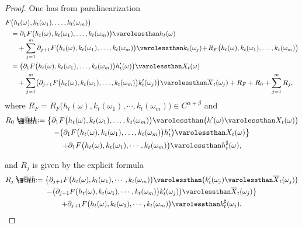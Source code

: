 \documentclass[JEP,XML,SOM,Unicode,published]{cedram}
\makeatletter
\theoremstyle{definition}
\newcommand*{\defeq}{\mathrel{\rlap{%
\raisebox{0.3ex}{$\m@th\cdot$}}%
\raisebox{-0.3ex}{$\m@th\cdot$}}%
=}
\makeatother
\begin{document}
\begin{proof}
One has from paralinearization
\begin{equation*} \begin{split}
F&\bigl(h_t(\omega), k_t(\omega_1),\dots, k_t(\omega_m)\bigr)\\
&= \partial_1F\bigl(h_t(\omega), k_t(\omega_1),\dots, k_t(\omega_m)\bigr) \varolessthan h_t(\omega) \\[-3pt]
&\quad+ \sum_{j=1}^m\partial_{j+1}F\bigl(h_t(\omega), k_t(\omega_1),\dots, k_t(\omega_m)\bigr) \varolessthan k_t(\omega_j)
\!+\! R_F\bigl(h_t(\omega), k_t(\omega_1),\dots, k_t(\omega_m)\bigr)\\
&=\bigl( \partial_1F\bigl(h_t(\omega), k_t(\omega_1),\dots, k_t(\omega_m)\bigr)h_t'(\omega) \bigr) \varolessthan X_t(\omega) \\
&\quad+ \sum_{j=1}^m\bigl(\partial_{j+1} F\bigl(h_t(\omega), k_t(\omega_1),\dots, k_t(\omega_m)\bigr)k_t'(\omega_j)\bigr) \varolessthan \overline X_t(\omega_j)+ R_F + R_0 + \sum_{j=1}^m R_j,
\end{split} \end{equation*}
where $R_F = R_F\bigl(h_t(\omega), k_t(\omega_1),\cdots, k_t(\omega_m)\bigr)\in C^{\alpha+\beta}$ and
\begin{multline*}
R_0\defeq \bigl\{\partial_1F\bigl(h_t(\omega), k_t(\omega_1), \dots, k_t(\omega_m)\bigr) \varolessthan\bigl(h'(\omega) \varolessthan X_t(\omega)\bigr) \\
- \bigl(\partial_1F\bigl(h_t(\omega), k_t(\omega_1), \dots, k_t(\omega_m)\bigr)h_t'\bigr) \varolessthan X_t(\omega) \bigr\} \\
+ \partial_1F\bigl(h_t(\omega), k_t(\omega_1),\cdots, k_t(\omega_m)\bigr) \varolessthan h_t^{\sharp}(\omega),
\end{multline*}
\par\noindent
\begin{minipage}{\textwidth}
and $R_j$ is given by the explicit formula
\begin{multline*}
R_j\defeq \bigl\{\partial_{j+1} F\bigl(h_t(\omega), k_t(\omega_1),\cdots, k_t(\omega_m)\bigr) \varolessthan \bigl( k_t'(\omega_j) \varolessthan \overline X_t(\omega_j)\bigr)
\\
-\bigl(\partial_{j+1} F\bigl(h_t(\omega), k_t(\omega_1),\cdots, k_t(\omega_m)\bigr) k_t'(\omega_j)\bigr) \varolessthan \overline X_t(\omega_j) \bigr\}
\\
+ \partial_{j+1} F\bigl(h_t(\omega), k_t(\omega_1),\cdots, k_t(\omega_m)\bigr) \varolessthan k_t^\sharp(\omega_j).
\end{multline*}

\end{minipage}
\end{proof}
\end{document}
